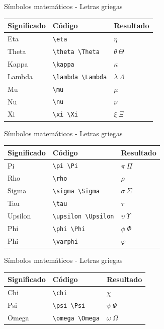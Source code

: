 \documentclass[
  ignorenonframetext,
  aspectratio=169]{beamer}
\begin{document}
\begin{frame}[fragile]{Símbolos matemáticos - Letras griegas}
\protect\hypertarget{suxedmbolos-matemuxe1ticos---letras-griegas-1}{}
\begin{longtable}[]{@{}lll@{}}
\toprule()
Significado & Código & Resultado \\
\midrule()
\endhead
Eta & \texttt{\textbackslash{}eta} & \(\eta\) \\
Theta & \texttt{\textbackslash{}theta\ \textbackslash{}Theta} &
\(\theta\ \Theta\) \\
Kappa & \texttt{\textbackslash{}kappa} & \(\kappa\) \\
Lambda & \texttt{\textbackslash{}lambda\ \textbackslash{}Lambda} &
\(\lambda\  \Lambda\) \\
Mu & \texttt{\textbackslash{}mu} & \(\mu\) \\
Nu & \texttt{\textbackslash{}nu} & \(\nu\) \\
Xi & \texttt{\textbackslash{}xi\ \textbackslash{}Xi} & \(\xi\ \Xi\) \\
\bottomrule()
\end{longtable}
\end{frame}

\begin{frame}[fragile]{Símbolos matemáticos - Letras griegas}
\protect\hypertarget{suxedmbolos-matemuxe1ticos---letras-griegas-2}{}
\begin{longtable}[]{@{}lll@{}}
\toprule()
Significado & Código & Resultado \\
\midrule()
\endhead
Pi & \texttt{\textbackslash{}pi\ \textbackslash{}Pi} & \(\pi\ \Pi\) \\
Rho & \texttt{\textbackslash{}rho} & \(\rho\) \\
Sigma & \texttt{\textbackslash{}sigma\ \textbackslash{}Sigma} &
\(\sigma\ \Sigma\) \\
Tau & \texttt{\textbackslash{}tau} & \(\tau\) \\
Upsilon & \texttt{\textbackslash{}upsilon\ \textbackslash{}Upsilon} &
\(\upsilon\ \Upsilon\) \\
Phi & \texttt{\textbackslash{}phi\ \textbackslash{}Phi} &
\(\phi\ \Phi\) \\
Phi & \texttt{\textbackslash{}varphi} & \(\varphi\) \\
\bottomrule()
\end{longtable}
\end{frame}

\begin{frame}[fragile]{Símbolos matemáticos - Letras griegas}
\protect\hypertarget{suxedmbolos-matemuxe1ticos---letras-griegas-3}{}
\begin{longtable}[]{@{}lll@{}}
\toprule()
Significado & Código & Resultado \\
\midrule()
\endhead
Chi & \texttt{\textbackslash{}chi} & \(\chi\) \\
Psi & \texttt{\textbackslash{}psi\ \textbackslash{}Psi} &
\(\psi\ \Psi\) \\
Omega & \texttt{\textbackslash{}omega\ \textbackslash{}Omega} &
\(\omega\ \Omega\) \\
\bottomrule()
\end{longtable}
\end{frame}
\end{document}
